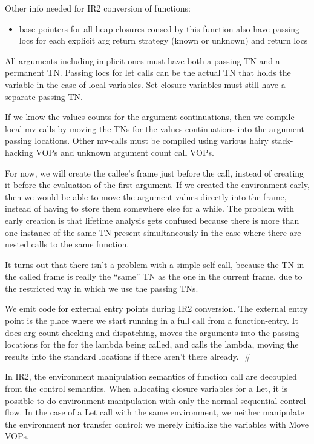 {\begin{itemize, spread 0, spacing 1}
Other info needed for IR2 conversion of functions:
\begin{itemize}
\item base pointers for all heap closures consed by this function also
  have passing locs for each explicit arg return strategy (known or
  unknown) and return locs
\end{itemize}


All arguments including implicit ones must have both a passing TN and a
permanent TN.  Passing locs for let calls can be the actual TN that holds the
variable in the case of local variables.  Set closure variables must still have
a separate passing TN.

If we know the values counts for the argument continuations, then we compile
local mv-calls by moving the TNs for the values continuations into the argument
passing locations.  Other mv-calls must be compiled using various hairy
stack-hacking VOPs and unknown argument count call VOPs.

For now, we will create the callee's frame just before the call, instead of
creating it before the evaluation of the first argument.  If we created the
environment early, then we would be able to move the argument values directly
into the frame, instead of having to store them somewhere else for a while.
The problem with early creation is that lifetime analysis gets confused because
there is more than one instance of the same TN present simultaneously in the
case where there are nested calls to the same function.

It turns out that there isn't a problem with a simple self-call, because the TN
in the called frame is really the ``same'' TN as the one in the current frame,
due to the restricted way in which we use the passing TNs.

We emit code for external entry points during IR2 conversion.  The external
entry point is the place where we start running in a full call from a
function-entry.  It does arg count checking and dispatching, moves the
arguments into the passing locations for the for the lambda being called, and
calls the lambda, moving the results into the standard locations if there
aren't there already.
|\#


In IR2, the environment manipulation semantics of function call are decoupled
from the control semantics.  When allocating closure variables for a Let, it is
possible to do environment manipulation with only the normal sequential control
flow.  In the case of a Let call with the same environment, we neither
manipulate the environment nor transfer control; we merely initialize the
variables with Move VOPs.


\end{itemize, spread 0, spacing 1}}
